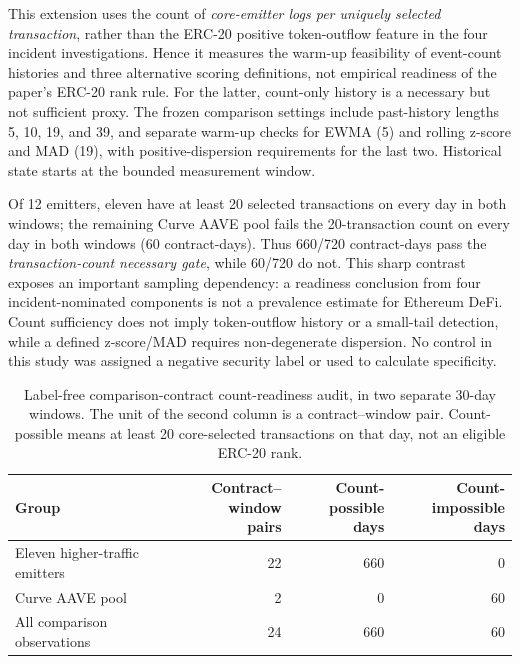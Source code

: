 \documentclass[preprint,12pt,authoryear]{elsarticle}
\begin{document}
This extension uses the count of \emph{core-emitter logs per uniquely selected transaction}, rather than the ERC-20 positive token-outflow feature in the four incident investigations. Hence it measures the warm-up feasibility of event-count histories and three alternative scoring definitions, not empirical readiness of the paper's ERC-20 rank rule. For the latter, count-only history is a necessary but not sufficient proxy. The frozen comparison settings include past-history lengths 5, 10, 19, and 39, and separate warm-up checks for EWMA (5) and rolling z-score and MAD (19), with positive-dispersion requirements for the last two. Historical state starts at the bounded measurement window.

Of 12 emitters, eleven have at least 20 selected transactions on every day in both windows; the remaining Curve AAVE pool fails the 20-transaction count on every day in both windows (60 contract-days). Thus 660/720 contract-days pass the \emph{transaction-count necessary gate}, while 60/720 do not. This sharp contrast exposes an important sampling dependency: a readiness conclusion from four incident-nominated components is not a prevalence estimate for Ethereum DeFi. Count sufficiency does not imply token-outflow history or a small-tail detection, while a defined z-score/MAD requires non-degenerate dispersion. No control in this study was assigned a negative security label or used to calculate specificity.

\begin{table}[htbp]
\centering\small
\caption{Label-free comparison-contract count-readiness audit, in two separate 30-day windows. The unit of the second column is a contract--window pair. Count-possible means at least 20 core-selected transactions on that day, not an eligible ERC-20 rank.}
\label{tab:control}
\begin{tabularx}{\linewidth}{@{}>{\raggedright\arraybackslash}X r r r@{}}
\toprule
Group & \shortstack{Contract--window\\pairs} & \shortstack{Count-possible\\days} & \shortstack{Count-impossible\\days}\\
\midrule
Eleven higher-traffic emitters & 22 & 660 & 0\\
Curve AAVE pool & 2 & 0 & 60\\
\midrule
All comparison observations & 24 & 660 & 60\\
\bottomrule
\end{tabularx}
\end{table}
\end{document}
